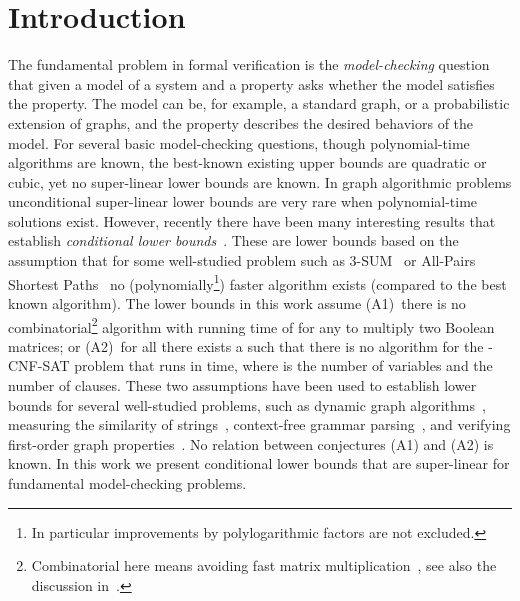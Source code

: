 \documentclass[11pt,letterpaper]{article}
\newif\iffullversion
\newcommand{\infull}[1]{\iffullversion #1\fi}
\begin{document}
\section{Introduction}
The fundamental problem in formal verification is the \emph{model-checking} 
question that given a model of a system and a property asks whether the model 
satisfies the property. 
The model can be, for example, a standard graph, or a probabilistic extension of 
graphs, and the property describes the desired behaviors\infull{ (or infinite paths)}
of the model. 
For several basic model-checking questions, though polynomial-time 
algorithms are known, the best-known existing upper bounds are quadratic or 
cubic, yet no super-linear lower bounds are known.
In graph algorithmic problems unconditional super-linear lower bounds are very 
rare when polynomial-time solutions exist.
However, recently there have been many interesting results that establish 
\emph{conditional lower bounds}~\cite{AbboudW14,AbboudWY15,AbboudBW15a}.
These are lower bounds based on the assumption that 
for some well-studied problem such as 3-SUM~\cite{GajentaanO12} or All-Pairs 
Shortest Paths~\cite{WilliamsW10,RodittyZ11} no (polynomially\footnote{In particular
improvements by polylogarithmic factors are not excluded.}) faster algorithm 
exists (compared to the best known algorithm).
The lower bounds in this work assume
(A1)~there is no combinatorial\footnote{Combinatorial here means avoiding fast matrix multiplication~\cite{LeGall14}, see also the 
discussion in~\cite{HenzingerKNS15}.} algorithm with running time of
 for any 
to multiply two  Boolean matrices;
or (A2)~for all  there exists a  such that there is no algorithm 
for the -CNF-SAT problem that runs in  time, where  is the number of variables and  the number of clauses. 
These two assumptions have been used to establish lower bounds for 
several well-studied problems, such as dynamic graph algorithms~\cite{AbboudW14,AbboudWY15}, 
measuring the similarity of strings~\cite{AbboudWW14,Bringmann14,
BringmannK15,BackursI15,AbboudBW15b}, context-free grammar
parsing~\cite{Lee02,AbboudBW15a}, and verifying first-order graph 
properties~\cite{PatrascuW10,Williams14}. 
No relation between conjectures (A1) and (A2) is known. 
In this work we present conditional lower bounds that are super-linear 
for fundamental model-checking problems.
\end{document}
